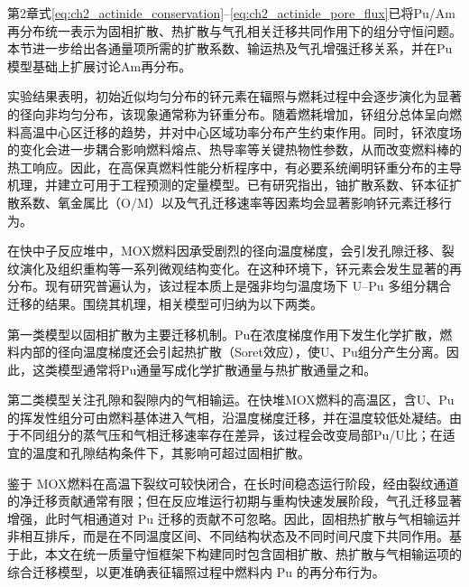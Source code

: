 第2章式\eqref{eq:ch2_actinide_conservation}--\eqref{eq:ch2_actinide_pore_flux}已将Pu/Am再分布统一表示为固相扩散、热扩散与气孔相关迁移共同作用下的组分守恒问题。本节进一步给出各通量项所需的扩散系数、输运热及气孔增强迁移关系，并在Pu模型基础上扩展讨论Am再分布。

实验结果表明\cite{clementPlutoniumRedistributionMixed1978}，初始近似均匀分布的钚元素在辐照与燃耗过程中会逐步演化为显著的径向非均匀分布，该现象通常称为钚重分布。随着燃耗增加，钚组分总体呈向燃料高温中心区迁移的趋势，并对中心区域功率分布产生约束作用\cite{meyerAnalysisPlutoniumSegregation1974}。同时，钚浓度场的变化会进一步耦合影响燃料熔点、热导率等关键热物性参数，从而改变燃料棒的热工响应。因此，在高保真燃料性能分析程序中，有必要系统阐明钚重分布的主导机理，并建立可用于工程预测的定量模型。已有研究\cite{boberPlutoniumRedistributionFast1973,matzkeDiffusionProcessesSurface1983}指出，铀扩散系数、钚本征扩散系数、氧金属比（O/M）以及气孔迁移速率等因素均会显著影响钚元素迁移行为。

\label{subsec:plutonium_migration}

在快中子反应堆中，MOX燃料因承受剧烈的径向温度梯度，会引发孔隙迁移、裂纹演化及组织重构等一系列微观结构变化。在这种环境下，钚元素会发生显著的再分布。现有研究\cite{boberMATERIALTRANSPORTTEMPERATURE1973,hoffmannCrackFormationCrack1974,clementPlutoniumRedistributionMixed1978}普遍认为，该过程本质上是强非均匀温度场下 U--Pu 多组分耦合迁移的结果。围绕其机理，相关模型可归纳为以下两类。

第一类模型以固相扩散为主要迁移机制\cite{olanderFundamentalAspectsNuclear1976}。Pu在浓度梯度作用下发生化学扩散，燃料内部的径向温度梯度还会引起热扩散（Soret效应），使U、Pu组分产生分离。因此，这类模型通常将Pu通量写成化学扩散通量与热扩散通量之和。

第二类模型关注孔隙和裂隙内的气相输运\cite{boberMATERIALTRANSPORTTEMPERATURE1973}。在快堆MOX燃料的高温区，含U、Pu的挥发性组分可由燃料基体进入气相，沿温度梯度迁移，并在温度较低处凝结。由于不同组分的蒸气压和气相迁移速率存在差异，该过程会改变局部Pu/U比；在适宜的温度和孔隙结构条件下，其影响可超过固相扩散。

鉴于 MOX燃料在高温下裂纹可较快闭合\cite{clementPlutoniumRedistributionMixed1978,olanderKineticsActinideRedistribution1973}，在长时间稳态运行阶段，经由裂纹通道的净迁移贡献通常有限；但在反应堆运行初期与重构快速发展阶段，气孔迁移显著增强，此时气相通道对 Pu 迁移的贡献不可忽略\cite{clementPlutoniumRedistributionMixed1978}。因此，固相热扩散与气相输运并非相互排斥，而是在不同温度区间、不同结构状态及不同时间尺度下共同作用。基于此，本文在统一质量守恒框架下构建同时包含固相扩散、热扩散与气相输运项的综合迁移模型，以更准确表征辐照过程中燃料内 Pu 的再分布行为。

